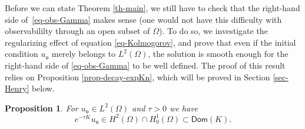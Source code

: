 \documentclass[10pt]{amsart}
\theoremstyle{plain}
\newtheorem{proposition}[theorem]{Proposition}
\theoremstyle{definition}
\newcommand{\1}{\mathds 1}
\newcommand{\Dom}{\mathsf{Dom}}
\let\O\Omega
\newcommand{\uo}{u_{\mathsf{o}}}
\begin{document}
Before we can state Theorem \ref{th-main}, we still have to check that the right-hand side of~\eqref{eq-obs-Gamma} makes sense (one would not have this difficulty with observabililty through an open subset of $\O$).
To do so, we investigate the regularizing effect of equation \eqref{eq-Kolmogorov}, and prove that
even if the initial condition $\uo$ merely belongs to $L^2(\O)$, the solution is smooth enough for the right-hand side
of \eqref{eq-obs-Gamma} to be well defined.
The proof of this result relies on Proposition \ref{prop-decay-expKn}, which will be proved in Section \ref{sec-Henry} below.

\begin{proposition} \label{prop-regularite}
For $\uo \in L^2(\O)$ and $\tau > 0$ we have
\[
e^{-\tau K} \uo \in H^2(\O) \cap H^1_0(\O) \subset \Dom(K).
\]
\end{proposition}
\end{document}
